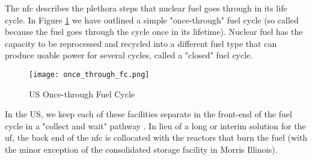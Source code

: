 The \gls{nfc} describes the plethora steps that nuclear fuel goes through
in its life cycle. In Figure \ref{fig:once-through} we have outlined a
simple "once-through" fuel cycle (so called because the fuel goes through
the cycle once in its lifetime). Nuclear fuel has the capacity to be
reprocessed and recycled into a different fuel type that can produce
usable power for several cycles, called a "closed" fuel cycle.

\begin{figure}[h]
    \centering
    \texttt{[image: once\_through\_fc.png]}
    \caption{US Once-through Fuel Cycle}
    \label{fig:once-through}
\end{figure}

 In the US, we keep each of these facilities separate in the front-end of
 the fuel cycle in a "collect and wait" pathway \cite{cycle_risks}. In
 lieu of a long or interim solution for the \gls{uf}, the back end of the
 \gls{nfc} is collocated with the reactors that burn the fuel (with the
 minor exception of the consolidated storage facility in Morris Illinois).
